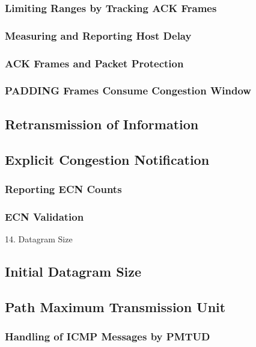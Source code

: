 \documentclass{article}
\begin{document}
\subsubsection{Limiting Ranges by Tracking ACK Frames}

\subsubsection{Measuring and Reporting Host Delay}

\subsubsection{ACK Frames and Packet Protection}

\subsubsection{PADDING Frames Consume Congestion Window}

\subsection{Retransmission of Information}

\subsection{Explicit Congestion Notification}

\subsubsection{Reporting ECN Counts}

\subsubsection{ECN Validation}

14. Datagram Size

\subsection{Initial Datagram Size}

\subsection{Path Maximum Transmission Unit}

\subsubsection{Handling of ICMP Messages by PMTUD}
\end{document}
